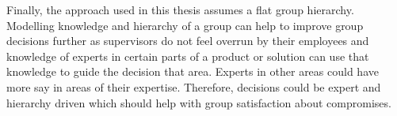 Finally, the approach used in this thesis assumes a flat group hierarchy. Modelling knowledge and hierarchy of a group can help to improve group decisions further as supervisors do not feel overrun by their employees and knowledge of experts in certain parts of a product or solution can use that knowledge to guide the decision that area. Experts in other areas could have more say in areas of their expertise. Therefore, decisions could be expert and hierarchy driven which should help with group satisfaction about compromises.